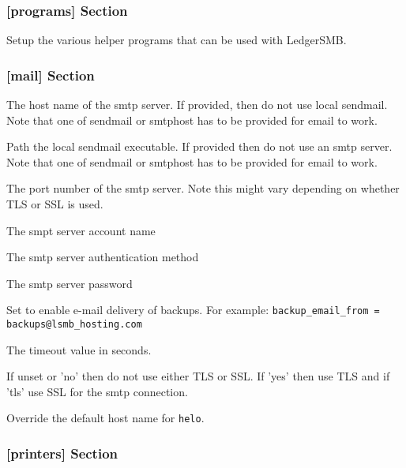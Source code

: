 \subsubsection{[programs] Section}
\label{subsubsec-global-config-ledgersmb-conf-programs}

Setup the various helper programs that can be used with LedgerSMB.

\subsubsection{[mail] Section}
\label{subsubsec-global-config-ledgersmb-conf-mail}

\begin{description}[style=nextline]
        \item [smtphost] The host name of the smtp server. If provided, then do not use local sendmail. Note that one of sendmail or smtphost has to be provided for email to work.
        \item [sendmail] Path the local sendmail executable. If provided then do not use an smtp server. Note that one of sendmail or smtphost has to be provided for email to work.
        \item [smtpport] The port number of the smtp server. Note this might vary depending on whether TLS or SSL is used.
        \item [smtpuser] The smpt server account name
        \item [smtpauthmech] The smtp server authentication method
        \item [smtppass] The smtp server password
        \item [backup\_email\_from] Set to enable e-mail delivery of backups. For example:
        \texttt{backup\_email\_from = backups@lsmb\_hosting.com}
        \item [smtptimeout] The timeout value in seconds.

        \item [smtptls] If unset or 'no' then do not use either TLS or SSL. If 'yes' then use TLS and if 'tls' use SSL for the smtp connection.

        \item [smtpsender\_hostname] Override the default host name for \texttt{helo}.
\end{description}

\subsubsection{[printers] Section}
\label{subsubsec-global-config-ledgersmb-conf-printers}

